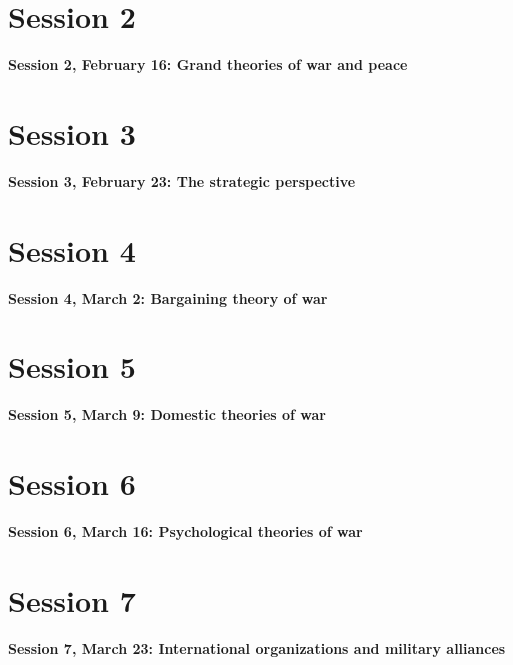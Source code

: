 \documentclass[a4paper,11pt]{article}
\begin{document}

\clearpage
\setcounter{tocdepth}{2}
\tableofcontents
\clearpage
\setcounter{page}{1}
\pagestyle{fancy}

\part{Session 2}
\textbf{Session 2, February 16: Grand theories of war and peace}







\newpage
\part{Session 3}
\textbf{Session 3, February 23: The strategic perspective}



\newpage
\part{Session 4}
\textbf{Session 4, March 2: Bargaining theory of war}



\newpage
\part{Session 5}
\textbf{Session 5, March 9: Domestic theories of war}



\newpage
\part{Session 6}
\textbf{Session 6, March 16: Psychological theories of war}



\newpage
\part{Session 7}
\textbf{Session 7, March 23: International organizations and military alliances}


\end{document}
